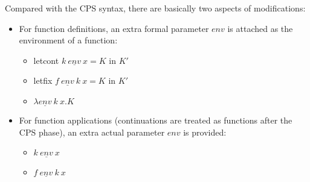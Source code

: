 \documentclass{article}
\theoremstyle{definition}
\theoremstyle{remark}
\numberwithin{equation}{section}
\begin{document}
Compared with the CPS syntax, there are basically two aspects of modifications:
\begin{itemize}
  \item For function definitions, an extra formal parameter $env$ is attached
    as the environment of a function:
    \begin{itemize}
      \item \textsf{letcont }$k\ \underline{env}\ x = K$\textsf{ in }$K'$
      \item \textsf{letfix }$f\ \underline{env}\ k\ x=K$\textsf{ in }$K'$
      \item  $\lambda \underline{env}\ k\ x.K$
    \end{itemize}
  \item For function applications (continuations are treated as functions after
  the CPS phase), an extra actual parameter $env$ is provided:
    \begin{itemize}
      \item $k\ \underline{env}\ x$
      \item $f\ \underline{env}\ k\ x$
    \end{itemize}
\end{itemize}
\end{document}
